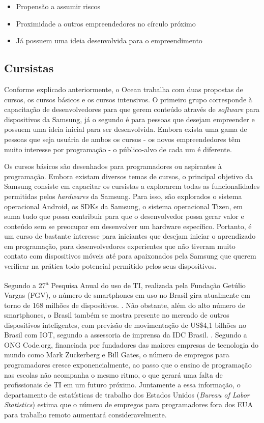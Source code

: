 \begin{itemize}
\item Propensão a assumir riscos
\item Proximidade a outros empreendedores no círculo próximo
\item Já possuem uma ideia desenvolvida para o empreendimento
\end{itemize}


\subsection{Cursistas}
\label{sec:con_cursistas}

Conforme explicado anteriormente, o Ocean trabalha com duas propostas de cursos, os cursos básicos e os cursos intensivos. O primeiro grupo corresponde à capacitação de desenvolvedores para que gerem conteúdo através de \textit{software} para dispositivos da Samsung, já o segundo é para pessoas que desejam empreender e possuem uma ideia inicial para ser desenvolvida. Embora exista uma gama de pessoas que seja usuária de ambos os cursos - os novos empreendedores têm muito interesse por programação - o público-alvo de cada um é diferente.

Os cursos básicos são desenhados para programadores ou aspirantes à programação. Embora existam diversos temas de cursos, o principal objetivo da Samsung consiste em capacitar os cursistas a explorarem todas as funcionalidades permitidas pelos \textit{hardwares} da Samsung. Para isso, são explorados o sistema operacional Android, os SDKs da Samsung, o sistema operacional Tizen, em suma tudo que possa contribuir para que o desenvolvedor possa gerar valor e conteúdo sem se preocupar em desenvolver um hardware específico. Portanto, é um curso de bastante interesse para iniciantes que desejam iniciar o aprendizado em programação, para desenvolvedores experientes que não tiveram muito contato com dispositivos móveis até para apaixonados pela Samsung que querem verificar na prática todo potencial permitido pelos seus dispositivos.

Segundo a 27\textsuperscript{a} Pesquisa Anual do uso de TI, realizada pela Fundação Getúlio Vargas (FGV), o número de smartphones em uso no Brasil gira atualmente em torno de 168 milhões de dispositivos. \cite{tifgv}. Não obstante, além do alto número de smartphones, o Brasil também se mostra presente no mercado de outros dispositivos inteligentes, com previsão de movimentação de US\$4,1 bilhões no Brasil com IOT, segundo a assessoria de imprensa da IDC Brasil. \cite{idc}. Segundo a ONG Code.org, financiada por fundadores das maiores empresas de tecnologia do mundo como Mark Zuckerberg e Bill Gates, o número de empregos para programadores cresce exponencialmente, ao passo que o ensino de programação nas escolas não acompanha o mesmo ritmo, o que gerará uma falta de profissionais de TI em um futuro próximo. Juntamente a essa informação, o departamento de estatísticas de trabalho dos Estados Unidos (\textit{Bureau of Labor Statistics}) estima que o número de empregos para programadores fora dos EUA para trabalho remoto aumentará consideravelmente. \cite{bls}

